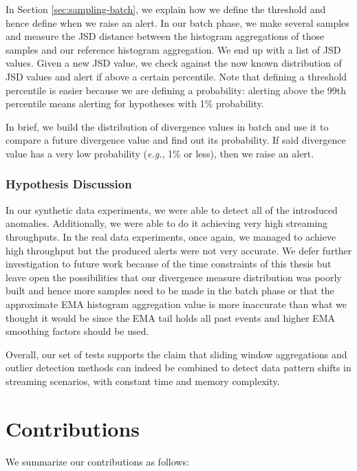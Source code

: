 In Section \ref{sec:sampling-batch}, we explain how we define the threshold and hence define when we raise an alert. In our batch phase, we make several samples and measure the JSD distance between the histogram aggregations of those samples and our reference histogram aggregation. We end up with a list of JSD values. Given a new JSD value, we check against the now known distribution of JSD values and alert if above a certain percentile. Note that defining a threshold percentile is easier because we are defining a probability: alerting above the 99th percentile means alerting for hypotheses with 1\% probability.

In brief, we build the distribution of divergence values in batch and use it to compare a future divergence value and find out its probability. If said divergence value has a very low probability (\textit{e.g.}, 1\% or less), then we raise an alert.

\subsubsection*{Hypothesis Discussion}
In our synthetic data experiments, we were able to detect all of the introduced anomalies. Additionally, we were able to do it achieving very high streaming throughputs. In the real data experiments, once again, we managed to achieve high throughput but the produced alerts were not very accurate. We defer further investigation to future work because of the time constraints of this thesis but leave open the possibilities that our divergence measure distribution was poorly built and hence more samples need to be made in the batch phase or that the approximate EMA histogram aggregation value is more inaccurate than what we thought it would be since the EMA tail holds all past events and higher EMA smoothing factors should be used.

Overall, our set of tests supports the claim that sliding window aggregations and outlier detection methods can indeed be combined to detect data pattern shifts in streaming scenarios, with constant time and memory complexity.

\section{Contributions}
We summarize our contributions as follows:

